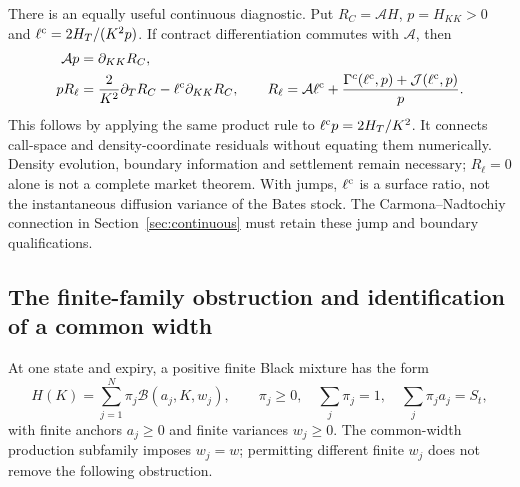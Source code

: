 \documentclass[11pt,a4paper]{article}
\numberwithin{equation}{section}
\theoremstyle{definition}\newtheorem{definition}[theorem]{Definition}
\theoremstyle{remark}\newtheorem{remark}[theorem]{Remark}
\newcommand{\Black}{\mathcal B}\newcommand{\LC}{\mathcal L}
\begin{document}
There is an equally useful continuous diagnostic. Put $R_C=\mathcal A H$, $p=H_{KK}>0$ and $\ell^{\rm c}=2H_T/(K^2p)$. If contract differentiation commutes with $\mathcal A$, then
\begin{align}
 \mathcal A p&=\partial_{KK}R_C,\notag\\
 pR_\ell&=\frac{2}{K^2}\partial_T R_C-\ell^{\rm c}\partial_{KK}R_C,
 \qquad
 R_\ell=\mathcal A\ell^{\rm c}
       +\frac{\Gamma^c(\ell^{\rm c},p)+\mathcal J(\ell^{\rm c},p)}{p}.
 \label{eq:gb-cont-diagnostic}
\end{align}
This follows by applying the same product rule to $\ell^{\rm c}p=2H_T/K^2$. It connects call-space and density-coordinate residuals without equating them numerically. Density evolution, boundary information and settlement remain necessary; $R_\ell=0$ alone is not a complete market theorem. With jumps, $\ell^{\rm c}$ is a surface ratio, not the instantaneous diffusion variance of the Bates stock. The Carmona--Nadtochiy connection in Section~\ref{sec:continuous} must retain these jump and boundary qualifications.

\subsection{The finite-family obstruction and identification of a common width}
\label{sec:bates-obstruction}
At one state and expiry, a positive finite Black mixture has the form
\begin{equation}
 H(K)=\sum_{j=1}^{N}\pi_j\Black(a_j,K,w_j),\qquad
 \pi_j\geq0,\quad\sum_j\pi_j=1,\quad
 \sum_j\pi_ja_j=S_t,
 \label{eq:gb-finite-family}
\end{equation}
with finite anchors $a_j\geq0$ and finite variances $w_j\geq0$. The common-width production subfamily imposes $w_j=w$; permitting different finite $w_j$ does not remove the following obstruction.
\end{document}
